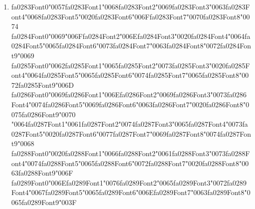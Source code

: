 \documentclass[12pt]{article}
\begin{document}
\begin{enumerate}[label=Q\arabic*.]
 \item {\csname fa0283Font0\endcsname\char"0057}{\csname fa0283Font1\endcsname\char"0068}{\csname fa0283Font2\endcsname\char"0069}{\csname fa0283Font3\endcsname\char"0063}{\csname fa0283Font4\endcsname\char"0068}{\csname fa0283Font5\endcsname\char"0020}{\csname fa0283Font6\endcsname\char"006F}{\csname fa0283Font7\endcsname\char"0070}{\csname fa0283Font8\endcsname\char"0074} {\csname fa0284Font0\endcsname\char"0069}{\char"006F}{\csname fa0284Font2\endcsname\char"006E}{\csname fa0284Font3\endcsname\char"0020}{\csname fa0284Font4\endcsname\char"0064}{\csname fa0284Font5\endcsname\char"0065}{\csname fa0284Font6\endcsname\char"0073}{\csname fa0284Font7\endcsname\char"0063}{\csname fa0284Font8\endcsname\char"0072}{\csname fa0284Font9\endcsname\char"0069} {\csname fa0285Font0\endcsname\char"0062}{\csname fa0285Font1\endcsname\char"0065}{\csname fa0285Font2\endcsname\char"0073}{\csname fa0285Font3\endcsname\char"0020}{\csname fa0285Font4\endcsname\char"0064}{\csname fa0285Font5\endcsname\char"0065}{\csname fa0285Font6\endcsname\char"0074}{\csname fa0285Font7\endcsname\char"0065}{\csname fa0285Font8\endcsname\char"0072}{\csname fa0285Font9\endcsname\char"006D} {\csname fa0286Font0\endcsname\char"0069}{\csname fa0286Font1\endcsname\char"006E}{\csname fa0286Font2\endcsname\char"0069}{\csname fa0286Font3\endcsname\char"0073}{\csname fa0286Font4\endcsname\char"0074}{\csname fa0286Font5\endcsname\char"0069}{\csname fa0286Font6\endcsname\char"0063}{\csname fa0286Font7\endcsname\char"0020}{\csname fa0286Font8\endcsname\char"0075}{\csname fa0286Font9\endcsname\char"0070} {\char"0064}{\csname fa0287Font1\endcsname\char"0061}{\csname fa0287Font2\endcsname\char"0074}{\csname fa0287Font3\endcsname\char"0065}{\csname fa0287Font4\endcsname\char"0073}{\csname fa0287Font5\endcsname\char"0020}{\csname fa0287Font6\endcsname\char"0077}{\csname fa0287Font7\endcsname\char"0069}{\csname fa0287Font8\endcsname\char"0074}{\csname fa0287Font9\endcsname\char"0068} {\csname fa0288Font0\endcsname\char"0020}{\csname fa0288Font1\endcsname\char"0066}{\csname fa0288Font2\endcsname\char"0061}{\csname fa0288Font3\endcsname\char"0073}{\csname fa0288Font4\endcsname\char"0074}{\csname fa0288Font5\endcsname\char"0065}{\csname fa0288Font6\endcsname\char"0072}{\csname fa0288Font7\endcsname\char"0020}{\csname fa0288Font8\endcsname\char"0063}{\csname fa0288Font9\endcsname\char"006F} {\csname fa0289Font0\endcsname\char"006E}{\csname fa0289Font1\endcsname\char"0076}{\csname fa0289Font2\endcsname\char"0065}{\csname fa0289Font3\endcsname\char"0072}{\csname fa0289Font4\endcsname\char"0067}{\csname fa0289Font5\endcsname\char"0065}{\csname fa0289Font6\endcsname\char"006E}{\csname fa0289Font7\endcsname\char"0063}{\csname fa0289Font8\endcsname\char"0065}{\csname fa0289Font9\endcsname\char"003F}

\end{enumerate}
\end{document}
